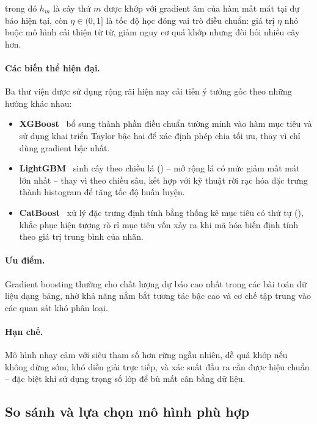 trong đó $h_m$ là cây thứ $m$ được khớp với gradient âm của hàm mất mát tại dự
báo hiện tại, còn $\eta \in (0, 1]$ là tốc độ học đóng vai trò điều chuẩn: giá
trị $\eta$ nhỏ buộc mô hình cải thiện từ từ, giảm nguy cơ quá khớp nhưng đòi hỏi
nhiều cây hơn.

\paragraph{Các biến thể hiện đại.} Ba thư viện được sử dụng rộng rãi hiện nay cải
tiến ý tưởng gốc theo những hướng khác nhau:

\begin{itemize}
  \item \textbf{XGBoost}~\cite{chen2016} bổ sung thành phần điều chuẩn tường minh
  vào hàm mục tiêu và sử dụng khai triển Taylor bậc hai để xác định phép chia tối
  ưu, thay vì chỉ dùng gradient bậc nhất.

  \item \textbf{LightGBM}~\cite{ke2017} sinh cây theo chiều lá
  () -- mở rộng lá có mức giảm mất mát lớn nhất -- thay vì theo
  chiều sâu, kết hợp với kỹ thuật rời rạc hóa đặc trưng thành histogram để tăng
  tốc độ huấn luyện.

  \item \textbf{CatBoost}~\cite{prokhorenkova2018} xử lý đặc trưng định tính bằng
  thống kê mục tiêu có thứ tự (), khắc phục hiện
  tượng rò rỉ mục tiêu vốn xảy ra khi mã hóa biến định tính theo giá trị trung
  bình của nhãn.
\end{itemize}

\paragraph{Ưu điểm.} Gradient boosting thường cho chất lượng dự báo cao nhất
trong các bài toán dữ liệu dạng bảng, nhờ khả năng nắm bắt tương tác bậc cao và
cơ chế tập trung vào các quan sát khó phân loại.

\paragraph{Hạn chế.} Mô hình nhạy cảm với siêu tham số hơn rừng ngẫu nhiên, dễ
quá khớp nếu không dừng sớm, khó diễn giải trực tiếp, và xác suất đầu ra cần được
hiệu chuẩn -- đặc biệt khi sử dụng trọng số lớp để bù mất cân bằng dữ liệu.

\subsection{So sánh và lựa chọn mô hình phù hợp}
\label{subsec:so-sanh-mo-hinh}

